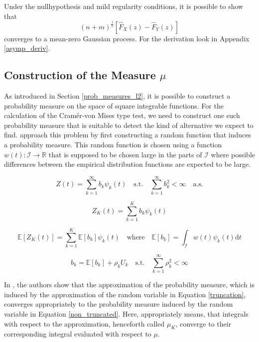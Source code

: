 \documentclass[12pt, a4paper]{article}
\theoremstyle{MAstyle} \newtheorem{assumption}{Assumption}[section]
\theoremstyle{MAstyle} \newtheorem{definition}{Definition}[section]
\begin{document}
			Under the nullhypothesis and mild regularity conditions, it is possible to show that 
			\begin{equation}
				(n+m)^{\frac{1}{2}} \left[\hat{F}_X(z) - \hat{F}_Y(z)\right]
			\end{equation}
			converges to a mean-zero Gaussian process. For the derivation look in Appendix \ref{asymp_deriv}.
		
		\subsection{Construction of the Measure $\mu$}
			As introduced in Section \ref{prob_measures_l2}, it is possible to construct a probability measure on the space of square integrable functions. For the calculation of the Cram\'{e}r-von Mises type test, we need to construct one such probability measure that is suitable to detect the kind of alternative we expect to find.
			\cite{bugni_permutation_2021} approach this problem by first constructing a random function that induces a probability measure. This random function is chosen using a function $w(t):\mathcal{I} \rightarrow \mathbb{R}$ that is supposed to be chosen large in the parts of $\mathcal{I}$ where possible differences between the empirical distribution functions are expected to be large.
			
			\begin{equation}\label{non_truncated}
				Z(t) = \sum_{k = 1}^{\infty} b_k \psi_k(t)
				\quad \text{s.t.} \quad
				\sum_{k = 1}^{\infty} b_k^2 < \infty \quad \text{a.s.}
			\end{equation}

			\begin{equation}\label{truncation}
				Z_K(t) = \sum_{k = 1}^{K} b_k \psi_k(t)
			\end{equation}
		
			\begin{equation}
				\mathbb{E}\left[Z_K(t)\right] = \sum_{k = 1}^{K} \mathbb{E}\left[b_k\right] \psi_k(t)
				\quad \text{where} \quad
				\mathbb{E}\left[b_k\right] = \int_{\mathcal{I}}w(t)\psi_k(t) \mathrm{d}t
			\end{equation}
		
			\begin{equation}
				b_k = \mathbb{E}\left[b_k\right] + \rho_k U_k
				\quad \text{s.t.} \quad
				\sum_{k = 1}^{\infty} \rho_k^2 < \infty 
			\end{equation}
			
			In \cite{bugni_goodness--fit_2009}, the authors show that the approximation of the probability measure, which is induced by the approximation of the random variable in Equation \ref{truncation}, converges appropriately to the probability measure induced by the random variable in Equation \ref{non_truncated}. Here, appropriately means, that integrals with respect to the approximation, henceforth called $\mu_K$, converge to their corresponding integral evaluated with respect to $\mu$.\\
			
\end{document}

